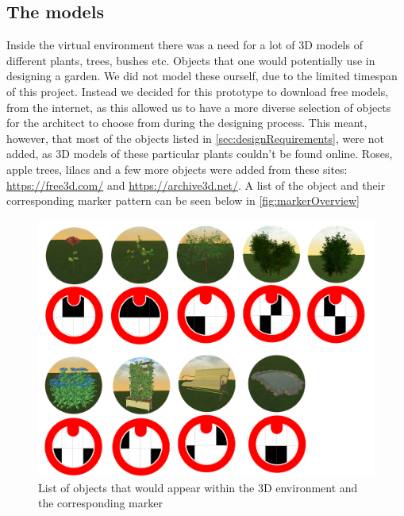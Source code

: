 \subsection{The models}
Inside the virtual environment there was a need for a lot of 3D models of different plants, trees, bushes etc. Objects that one would potentially use in designing a garden. We did not model these ourself, due to the limited timespan of this project. Instead we decided for this prototype to download free models, from the internet, as this allowed us to have a more diverse selection of objects for the architect to choose from during the designing process. This meant, however, that most of the objects listed in \autoref{sec:designRequirements}, were not added, as 3D models of these particular plants couldn't be found online. Roses, apple trees, lilacs and a few more objects were added from these sites: \url{https://free3d.com/} and \url{https://archive3d.net/}. A list of the object and their corresponding marker pattern can be seen below in \autoref{fig:markerOverview}

\begin{figure}[H]
	\centering
	\includegraphics[width=0.9\linewidth]{figure/Appendices/markersOverview.png}
	\caption{List of objects that would appear within the 3D environment and the corresponding marker}
	\label{fig:markerOverview}
\end{figure}








